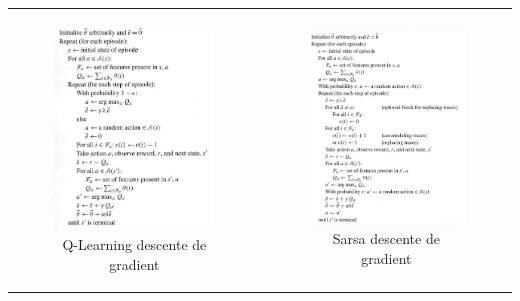 \documentclass[a4paper,12pt]{article}
\begin{document}
              \begin{center}
	\begin{tabular}{cc}
	  \hspace*{-1cm}
	  \begin{minipage}[b]{.52\linewidth}
	    \begin{figure}[H]
	      \includegraphics[width=270px]{QLearning_Gradient}
	      \caption{ Q-Learning descente de gradient  }
	    \end{figure}
	  \end{minipage}
	  &
	  \begin{minipage}[b]{.5\linewidth}
	    \begin{figure}[H]
	      \includegraphics[width=270px]{Sarsa_Gradient}
	      \caption{ Sarsa descente de gradient  }
	    \end{figure}
	  \end{minipage}
	\end{tabular}
      \end{center} 
      



\end{document}
